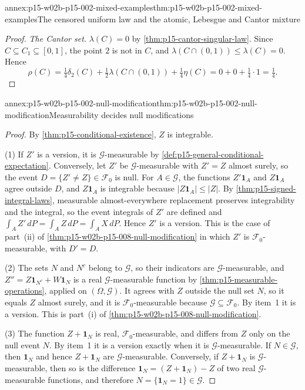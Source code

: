 \begin{annexitem}{annex:p15-w02b-p15-002-mixed-examples}{thm:p15-w02b-p15-002-mixed-examples}{The censored uniform law and the atomic, Lebesgue and Cantor mixture}
\begin{proof}
\emph{The Cantor set.} \(\lambda(C)=0\) by
\cref{thm:p15-cantor-singular-law}. Since \(C\subseteq C_1\subseteq
[0,1]\), the point \(2\) is not in \(C\), and
\(\lambda(C\cap(0,1))\leq\lambda(C)=0\). Hence
\[
 \rho(C)=\tfrac14\delta_2(C)+\tfrac12\lambda(C\cap(0,1))
         +\tfrac14\eta(C)=0+0+\tfrac14\cdot1=\tfrac14 .
\]
\end{proof}
\end{annexitem}

\begin{annexitem}{annex:p15-w02b-p15-002-null-modification}{thm:p15-w02b-p15-002-null-modification}{Measurability decides null modifications}
\begin{proof}
By \cref{thm:p15-conditional-existence}, \(Z\) is integrable.

(1) If \(Z'\) is a version, it is \(\mathcal G\)-measurable by
\cref{def:p15-general-conditional-expectation}. Conversely, let \(Z'\)
be \(\mathcal G\)-measurable with \(Z'=Z\) almost surely, so the event
\(D=\{Z'\neq Z\}\in\mathcal F_0\) is null. For \(A\in\mathcal G\), the
functions \(Z'\mathbf1_A\) and \(Z\mathbf1_A\) agree outside \(D\), and
\(Z\mathbf1_A\) is integrable because \(|Z\mathbf1_A|\leq|Z|\). By
\cref{thm:p15-signed-integral-laws}, measurable almost-everywhere
replacement preserves integrability and the integral, so the event
integrals of \(Z'\) are defined and
\(\int_AZ'\,dP=\int_AZ\,dP=\int_AX\,dP\). Hence \(Z'\) is a version.
This is the case of part~(ii) of
\cref{thm:p15-w02b-p15-008-null-modification} in which \(Z'\) is
\(\mathcal F_0\)-measurable, with \(D'=D\).

(2) The sets \(N\) and \(N^c\) belong to \(\mathcal G\), so their
indicators are \(\mathcal G\)-measurable, and
\(Z''=Z\mathbf1_{N^c}+W\mathbf1_N\) is a real \(\mathcal G\)-measurable
function by \cref{thm:p15-measurable-operations}, applied on
\((\Omega,\mathcal G)\). It agrees with \(Z\) outside the null set \(N\),
so it equals \(Z\) almost surely, and it is \(\mathcal F_0\)-measurable
because \(\mathcal G\subseteq\mathcal F_0\). By item~1 it is a version.
This is part~(i) of \cref{thm:p15-w02b-p15-008-null-modification}.

(3) The function \(Z+\mathbf1_N\) is real, \(\mathcal F_0\)-measurable,
and differs from \(Z\) only on the null event \(N\). By item~1 it is a
version exactly when it is \(\mathcal G\)-measurable. If
\(N\in\mathcal G\), then \(\mathbf1_N\) and hence \(Z+\mathbf1_N\) are
\(\mathcal G\)-measurable. Conversely, if \(Z+\mathbf1_N\) is
\(\mathcal G\)-measurable, then so is the difference
\(\mathbf1_N=(Z+\mathbf1_N)-Z\) of two real \(\mathcal G\)-measurable
functions, and therefore \(N=\{\mathbf1_N=1\}\in\mathcal G\).


\end{proof}
\end{annexitem}
